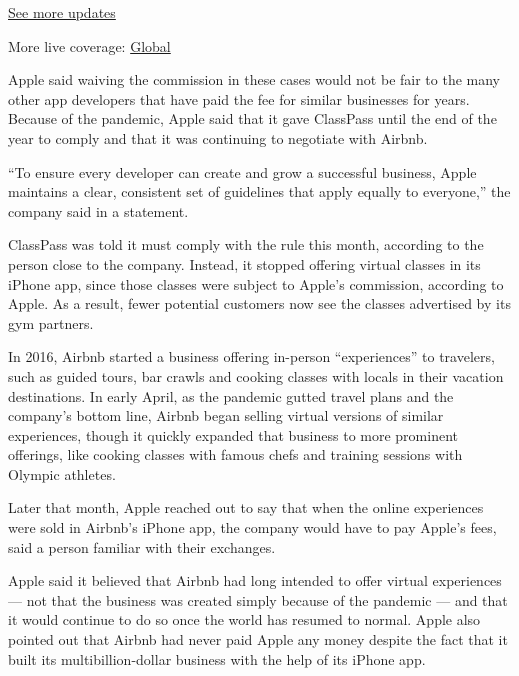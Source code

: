 \href{https://www.nytimes.com/live/2020/07/31/business/stock-market-today-coronavirus?action=click\&pgtype=Article\&state=default\&region=MAIN_CONTENT_1\&context=storylines_live_updates}{See
more updates}

More live coverage:
\href{https://www.nytimes.com/2020/08/01/world/coronavirus-covid-19.html?action=click\&pgtype=Article\&state=default\&region=MAIN_CONTENT_1\&context=storylines_live_updates}{Global}

Apple said waiving the commission in these cases would not be fair to
the many other app developers that have paid the fee for similar
businesses for years. Because of the pandemic, Apple said that it gave
ClassPass until the end of the year to comply and that it was continuing
to negotiate with Airbnb.

``To ensure every developer can create and grow a successful business,
Apple maintains a clear, consistent set of guidelines that apply equally
to everyone,'' the company said in a statement.

ClassPass was told it must comply with the rule this month, according to
the person close to the company. Instead, it stopped offering virtual
classes in its iPhone app, since those classes were subject to Apple's
commission, according to Apple. As a result, fewer potential customers
now see the classes advertised by its gym partners.

In 2016, Airbnb started a business offering in-person ``experiences'' to
travelers, such as guided tours, bar crawls and cooking classes with
locals in their vacation destinations. In early April, as the pandemic
gutted travel plans and the company's bottom line, Airbnb began selling
virtual versions of similar experiences, though it quickly expanded that
business to more prominent offerings, like cooking classes with famous
chefs and training sessions with Olympic athletes.

Later that month, Apple reached out to say that when the online
experiences were sold in Airbnb's iPhone app, the company would have to
pay Apple's fees, said a person familiar with their exchanges.

Apple said it believed that Airbnb had long intended to offer virtual
experiences --- not that the business was created simply because of the
pandemic --- and that it would continue to do so once the world has
resumed to normal. Apple also pointed out that Airbnb had never paid
Apple any money despite the fact that it built its multibillion-dollar
business with the help of its iPhone app.

